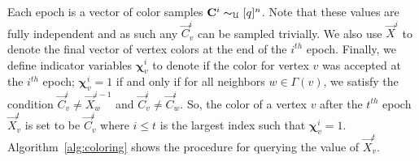 

Each epoch is a vector of color samples $\vec C^{i} \thicksim_{\mathcal U} [q]^n$.
Note that these values are fully independent and as such any $\vec C^i_v$ can be sampled trivially.
We also use $\vec X^i$ to denote the final vector of vertex colors at the end of the $i^{th}$ epoch.
Finally, we define indicator variables $\bm \chi^i_v$ to denote if the color for vertex $v$ was accepted at the $i^{th}$ epoch;
$\bm \chi^i_v = 1$ if and only if for all neighbors $w\in \Gamma(v)$,
we satisfy the condition $\vec  C^i_v\not= \vec X^{i-1}_w$ and $\vec C^i_v\not= \vec C^i_w$.
So, the color of a vertex $v$ after the $t^{th}$ epoch $\vec X^t_v$ is set to be $\vec C^i_v$
where $i\le t$ is the largest index such that $\bm \chi^i_v=1$.
Algorithm~\ref{alg:coloring} shows the procedure for querying the value of $\vec X^t_v$.


